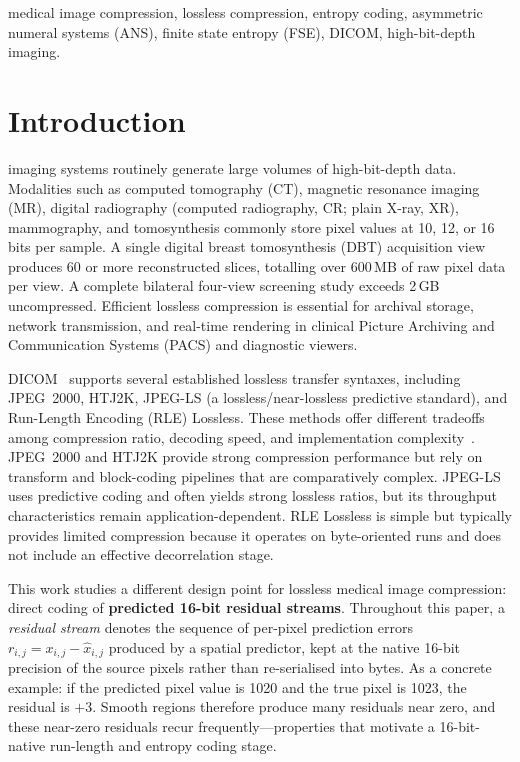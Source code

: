 \documentclass[journal]{IEEEtran}
\begin{document}
\begin{IEEEkeywords}
medical image compression, lossless compression, entropy coding, asymmetric
numeral systems (ANS), finite state entropy (FSE), DICOM, high-bit-depth
imaging.
\end{IEEEkeywords}

\section{Introduction}
\label{sec:intro}

 imaging systems routinely generate large volumes of
high-bit-depth data. Modalities such as computed tomography (CT), magnetic
resonance imaging (MR), digital radiography (computed radiography,
CR; plain X-ray, XR), mammography, and tomosynthesis commonly store pixel
values at 10, 12, or 16 bits per sample. A single digital breast tomosynthesis
(DBT) acquisition view produces 60 or more reconstructed slices, totalling over
600\,MB of raw pixel data per view. A complete bilateral four-view screening
study exceeds 2\,GB uncompressed. Efficient lossless compression is essential
for archival storage, network transmission, and real-time rendering in clinical
Picture Archiving and Communication Systems (PACS) and diagnostic viewers.

DICOM~\cite{dicom} supports several established lossless transfer syntaxes,
including JPEG~2000, HTJ2K, JPEG-LS (a lossless/near-lossless predictive
standard), and Run-Length Encoding (RLE) Lossless. These methods offer
different tradeoffs among compression ratio, decoding speed, and
implementation complexity~\cite{liu2017,clunie2000}. JPEG~2000 and HTJ2K
provide strong compression performance but rely on transform and block-coding
pipelines that are comparatively complex. JPEG-LS uses predictive coding and
often yields strong lossless ratios, but its throughput characteristics remain
application-dependent. RLE Lossless is simple but typically provides limited
compression because it operates on byte-oriented runs and does not include an
effective decorrelation stage.

This work studies a different design point for lossless medical image
compression: direct coding of \textbf{predicted 16-bit residual streams}.
Throughout this paper, a \emph{residual stream} denotes the sequence of
per-pixel prediction errors $r_{i,j} = x_{i,j} - \hat{x}_{i,j}$ produced by a
spatial predictor, kept at the native 16-bit precision of the source pixels
rather than re-serialised into bytes. As a concrete example: if the predicted
pixel value is 1020 and the true pixel is 1023, the residual is $+3$.
Smooth regions therefore produce many residuals near zero, and these near-zero
residuals recur frequently---properties that motivate a 16-bit-native
run-length and entropy coding stage.
\end{document}
